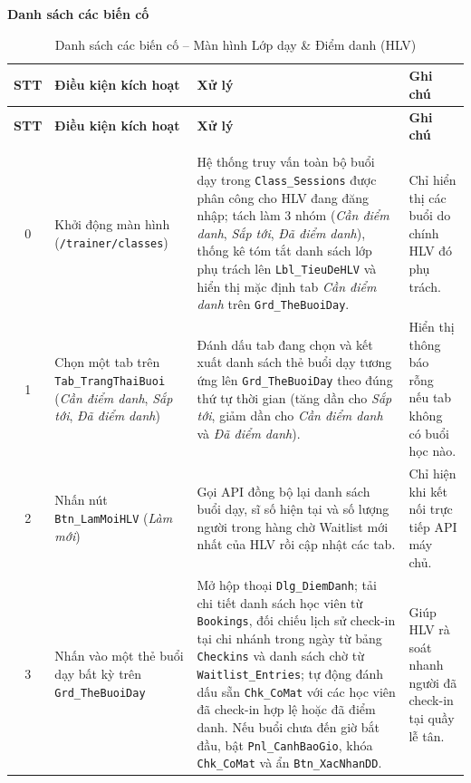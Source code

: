 \documentclass[a4paper,12pt]{article}
\begin{document}
\par\medskip\noindent\textbf{Danh sách các biến cố}\par\smallskip
{\footnotesize
\setlength{\tabcolsep}{4pt}
\begin{longtable}{|c|L{3.5cm}|L{7.8cm}|L{3.5cm}|}
\hline
\textbf{STT} & \textbf{Điều kiện kích hoạt} & \textbf{Xử lý} & \textbf{Ghi chú} \\
\hline
\endfirsthead
\hline
\textbf{STT} & \textbf{Điều kiện kích hoạt} & \textbf{Xử lý} & \textbf{Ghi chú} \\
\hline
\endhead
\hline
\endfoot
\hline
\caption{Danh sách các biến cố -- Màn hình Lớp dạy \& Điểm danh (HLV)} \\
\endlastfoot

0 & Khởi động màn hình (\texttt{/trainer/classes}) &
Hệ thống truy vấn toàn bộ buổi dạy trong \texttt{Class\_Sessions} được phân công cho HLV đang đăng nhập; tách làm $3$ nhóm (\textit{Cần điểm danh}, \textit{Sắp tới}, \textit{Đã điểm danh}), thống kê tóm tắt danh sách lớp phụ trách lên \texttt{Lbl\_TieuDeHLV} và hiển thị mặc định tab \textit{Cần điểm danh} trên \texttt{Grd\_TheBuoiDay}. &
Chỉ hiển thị các buổi do chính HLV đó phụ trách. \\ \hline

1 & Chọn một tab trên \texttt{Tab\_TrangThaiBuoi} (\textit{Cần điểm danh}, \textit{Sắp tới}, \textit{Đã điểm danh}) &
Đánh dấu tab đang chọn và kết xuất danh sách thẻ buổi dạy tương ứng lên \texttt{Grd\_TheBuoiDay} theo đúng thứ tự thời gian (tăng dần cho \textit{Sắp tới}, giảm dần cho \textit{Cần điểm danh} và \textit{Đã điểm danh}). &
Hiển thị thông báo rỗng nếu tab không có buổi học nào. \\ \hline

2 & Nhấn nút \texttt{Btn\_LamMoiHLV} (\textit{Làm mới}) &
Gọi API đồng bộ lại danh sách buổi dạy, sĩ số hiện tại và số lượng người trong hàng chờ Waitlist mới nhất của HLV rồi cập nhật các tab. &
Chỉ hiện khi kết nối trực tiếp API máy chủ. \\ \hline

3 & Nhấn vào một thẻ buổi dạy bất kỳ trên \texttt{Grd\_TheBuoiDay} &
Mở hộp thoại \texttt{Dlg\_DiemDanh}; tải chi tiết danh sách học viên từ \texttt{Bookings}, đối chiếu lịch sử check-in tại chi nhánh trong ngày từ bảng \texttt{Checkins} và danh sách chờ từ \texttt{Waitlist\_Entries}; tự động đánh dấu sẵn \texttt{Chk\_CoMat} với các học viên đã check-in hợp lệ hoặc đã điểm danh. Nếu buổi chưa đến giờ bắt đầu, bật \texttt{Pnl\_CanhBaoGio}, khóa \texttt{Chk\_CoMat} và ẩn \texttt{Btn\_XacNhanDD}. &
Giúp HLV rà soát nhanh người đã check-in tại quầy lễ tân. \\ \hline


\end{longtable}}
\end{document}
